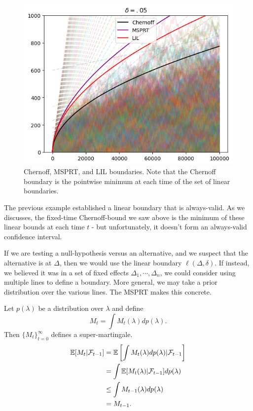 \begin{figure}
    \centering
    \includegraphics{boundaries.png}
    \caption{Chernoff, MSPRT, and LIL boundaries. Note that the Chernoff boundary is the pointwise minimum at each time of the set of linear boundaries. }
    \label{fig:boundaries}
\end{figure}


The previous example established a linear boundary that is always-valid. As we discusses, the fixed-time Chernoff-bound we saw above is the minimum of these linear bounds at each time $t$ - but unfortunately, it doesn't form an always-valid confidence interval.

If we are testing a null-hypothesis versus an alternative, and we suspect that the alternative is at $\Delta$, then we would use the linear boundary $\ell(\Delta, \delta)$. If instead, we believed it was in a set of fixed effects $\Delta_1, \cdots, \Delta_n$, we could consider using multiple lines to define a boundary. More general, we may take a prior distribution over the various lines. The MSPRT makes this concrete.


Let $p(\lambda)$ be a distribution over $\lambda$ and define \[M_t = \int M_t(\lambda) dp(\lambda).\]
Then $\{M_t\}_{t=0}^{\infty}$ defines a super-martingale.
\begin{align*}
    \mathbb{E}[M_t|\mathcal{F}_{t-1}] 
    &= \mathbb{E}\left[\int M_t(\lambda)dp(\lambda)|\mathcal{F}_{t-1}\right] \\
    &= \int \mathbb{E}[M_t(\lambda)|\mathcal{F}_{t-1}] dp(\lambda) \\
    &\leq \int M_{t-1}(\lambda) dp(\lambda) \\    
    &= M_{t-1}.
\end{align*}


